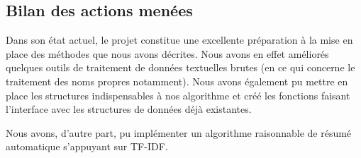 \documentclass[a4paper, 12pt]{article}
\begin{document}
\subsection{Bilan des actions menées}

Dans son état actuel, le projet constitue une excellente préparation à la mise en place des méthodes que nous avons décrites. Nous avons en effet améliorés quelques outils de traitement de données textuelles brutes (en ce qui concerne le traitement des noms propres notamment). Nous avons également pu mettre en place les structures indispensables à nos algorithme et créé les fonctions faisant l'interface avec les structures de données déjà existantes.

Nous avons, d'autre part, pu implémenter un algorithme raisonnable de résumé automatique s'appuyant sur TF-IDF. %

\vspace{1\baselineskip}






\end{document}
